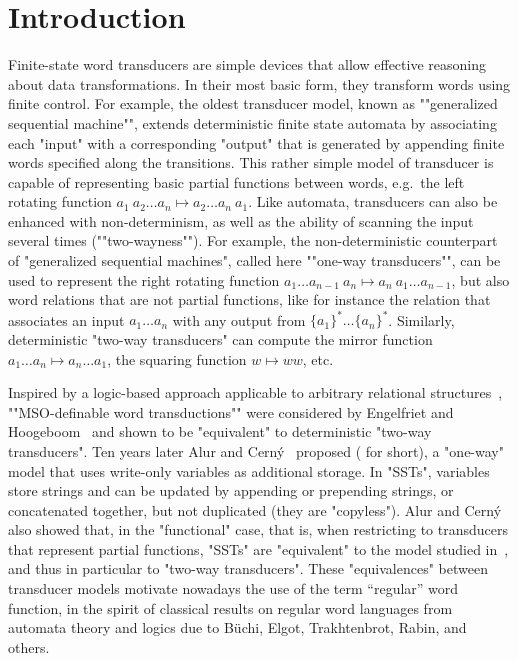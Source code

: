 \documentclass{theoretics}
\begin{document}
\section{Introduction}\label{sec:intro}
\enlargethispage{-\baselineskip}
Finite-state word transducers are simple devices that allow 
effective reasoning about data transformations. 
In their most basic form, they transform words using finite control. 
\AP
For example, the oldest transducer model, 
known as ""generalized sequential machine"", 
extends deterministic finite state automata by associating each "input" with a corresponding "output"
that is generated by appending finite words specified along the transitions.
This rather simple model of transducer is capable of representing 
basic partial functions between words, e.g.~the left 
rotating function $a_1\: a_2\dots a_n\mapsto a_2\dots a_n \: a_1$.
\AP
Like automata, transducers can also be enhanced with non-determinism,
as well as the ability of scanning the input several times (""two-wayness"").
\AP
For example, the non-deterministic counterpart of 
"generalized sequential machines", called here ""one-way transducers"", 
can be used to represent the right rotating function 
$a_1\dots a_{n-1}\: a_n\mapsto a_n\:a_1\dots a_{n-1}$,
but also word relations that are not partial functions, like for 
instance the relation that associates an input $a_1\dots a_n$ 
with any output from $\{a_1\}^*\dots \{a_n\}^*$.
Similarly, deterministic "two-way transducers" can compute 
the mirror function $a_1\dots a_n \mapsto a_n\dots a_1$,
the squaring function $w \mapsto w w$, etc.

\AP
Inspired by a logic-based approach applicable to arbitrary relational structures~\cite{CE12}, 
""MSO-definable word transductions"" were considered by Engelfriet and
Hoogeboom~\cite{eh01} and shown to be "equivalent" to deterministic 
"two-way transducers".
\AP
Ten years later Alur and Cern{\'y}~\cite{DBLP:conf/fsttcs/AlurC10} proposed 
 ( for short), 
a "one-way" model that uses write-only variables as additional storage. 
In "SSTs", variables store strings and  can be updated by appending or prepending strings, or 
concatenated together, but not duplicated (they are "copyless"). 
Alur and Cern{\'y} also showed that, in the "functional" case, 
that is, when restricting to transducers that represent partial functions,
"SSTs" are "equivalent" to the model studied in~\cite{eh01},
and thus in particular to "two-way transducers".
These "equivalences" between transducer models motivate nowadays 
the use of the term ``regular'' word function, in the spirit of
classical results on regular word languages from automata theory 
and logics due to B\"uchi, Elgot, Trakhtenbrot, Rabin, and others. 
\end{document}
